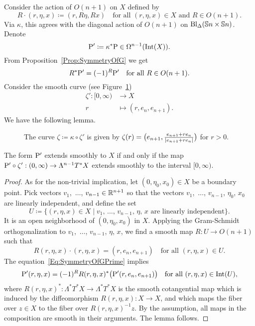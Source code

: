 \documentclass[\MainFolder/Text.tex]{subfiles}
\begin{document}
%
Consider the action of $O(n+1)$ on $X$ defined by
\[ R\cdot(r,\eta,x) \coloneqq (r,R\eta,Rx)\quad\text{for all }(r,\eta,x)\in X\text{ and }R\in O(n+1). \]
Via $\kappa$, this agrees with the diagonal action of $O(n+1)$ on $\mathrm{Bl}_\Delta(\mathbb{S}{n}\times\mathbb{S}{n})$. Denote
\[ \mathrm{P}'\coloneqq \kappa^* \mathrm{P} \in \Omega^{n-1}(\mathrm{Int}(X)). \]
From Proposition~\ref{Prop:SymmetryOfG} we get
\begin{equation} \label{Eq:SymmetryOfGPrime}
R^* \mathrm{P}' = (-1)^R \mathrm{P}'\quad \text{for all }R\in O(n+1).
\end{equation}
%
Consider the smooth curve (see Figure~\ref{Fig:CurveOnSphere})
\begin{equation*}\label{Eq:CurveZetaDef}
 \begin{aligned} \zeta': [0,\infty) &\longrightarrow  X \\
                    r &\longmapsto (r,e_n,e_{n+1}). \end{aligned}
\end{equation*}
We have the following lemma.
%
\begin{figure}[t]\centering

\caption[A curve approaching the diagonal in the configuration space $C_2(\Sph{n})$.]{The curve $\zeta\coloneqq \kappa \circ \zeta'$ is given by $\zeta(r)=\bigl(e_{n+1},\frac{e_{n+1}+r e_n}{|e_{n+1}+r e_n|}\bigr)$ for $r>0$.}\label{Fig:CurveOnSphere}
\end{figure}
%
\begin{Lem} \label{Lem:ExtAlongCurve}
The form $\mathrm{P}'$ extends smoothly to $X$ if and only if the map $\mathrm{P}'\circ \zeta' : (0,\infty)\rightarrow \Lambda^{n-1}T^* X$ extends smoothly to the interval $[0,\infty)$. 
\end{Lem}
%
\begin{proof}
As for the non-trivial implication, let $(0,\eta_0,x_0) \in X$ be a boundary point. Pick vectors $v_1$,~$\dotsc$, $v_{n-1}\in \mathbb{R}^{n+1}$ so that the vectors $v_1$,~$\dotsc$, $v_{n-1}$, $\eta_0$, $x_0$ are linearly independent, and define the set 
\[ U\coloneqq\{(r,\eta,x)\in X \mid v_1,\,\dotsc,\,v_{n-1},\,\eta,\,x \text{ are linearly independent}\}. \]
It is an open neighborhood of $(0,\eta_0,x_0)$ in $X$. Applying the Gram-Schmidt orthogonalization to $v_1$,~$\dotsc$, $v_{n-1}$, $\eta$, $x$, we find a smooth map $R: U \rightarrow O(n+1)$ such that 
\[ R(r,\eta,x)\cdot (r,\eta,x) = (r,e_n,e_{n+1}) \quad \text{for all }(r,\eta,x)\in U. \]
The equation~\eqref{Eq:SymmetryOfGPrime} implies
\[ \mathrm{P}'(r,\eta,x) =(-1)^R R(r,\eta,x)^*\bigl(\mathrm{P}'(r,e_n,e_{n+1})\bigr)\quad\text{for all }(r,\eta,x)\in \mathrm{Int}(U), \]
where $R(r,\eta,x)^*: \Lambda^* T^* X \rightarrow \Lambda^* T^* X$ is the smooth cotangential map which is induced by the diffeomorphism $R(r,\eta,x): X\rightarrow X$, and which maps the fiber over $z\in X$ to the fiber over $R(r,\eta,x)^{-1} z$. By the assumption, all maps in the composition are smooth in their arguments. The lemma follows.
\end{proof}
\end{document}
